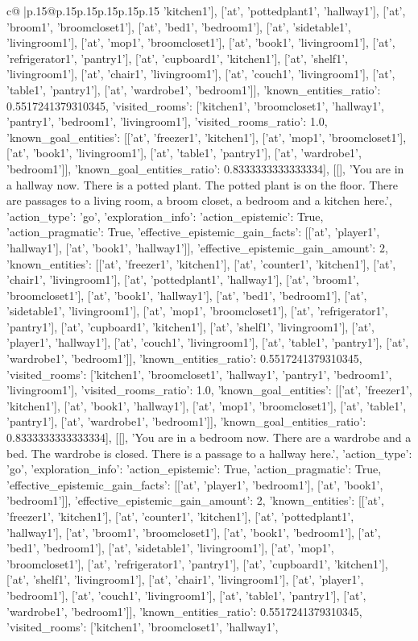 \documentclass{article}
\begin{document}
{\begin{supertabular}{c@{$\;$}|p{.15\linewidth}@{}p{.15\linewidth}p{.15\linewidth}p{.15\linewidth}p{.15\linewidth}p{.15\linewidth}}
{{{'kitchen1'], ['at', 'pottedplant1', 'hallway1'], ['at', 'broom1', 'broomcloset1'], ['at', 'bed1', 'bedroom1'], ['at', 'sidetable1', 'livingroom1'], ['at', 'mop1', 'broomcloset1'], ['at', 'book1', 'livingroom1'], ['at', 'refrigerator1', 'pantry1'], ['at', 'cupboard1', 'kitchen1'], ['at', 'shelf1', 'livingroom1'], ['at', 'chair1', 'livingroom1'], ['at', 'couch1', 'livingroom1'], ['at', 'table1', 'pantry1'], ['at', 'wardrobe1', 'bedroom1']], 'known_entities_ratio': 0.5517241379310345, 'visited_rooms': ['kitchen1', 'broomcloset1', 'hallway1', 'pantry1', 'bedroom1', 'livingroom1'], 'visited_rooms_ratio': 1.0, 'known_goal_entities': [['at', 'freezer1', 'kitchen1'], ['at', 'mop1', 'broomcloset1'], ['at', 'book1', 'livingroom1'], ['at', 'table1', 'pantry1'], ['at', 'wardrobe1', 'bedroom1']], 'known_goal_entities_ratio': 0.8333333333333334}}], [[], 'You are in a hallway now. There is a potted plant. The potted plant is on the floor. There are passages to a living room, a broom closet, a bedroom and a kitchen here.', {'action_type': 'go', 'exploration_info': {'action_epistemic': True, 'action_pragmatic': True, 'effective_epistemic_gain_facts': [['at', 'player1', 'hallway1'], ['at', 'book1', 'hallway1']], 'effective_epistemic_gain_amount': 2, 'known_entities': [['at', 'freezer1', 'kitchen1'], ['at', 'counter1', 'kitchen1'], ['at', 'chair1', 'livingroom1'], ['at', 'pottedplant1', 'hallway1'], ['at', 'broom1', 'broomcloset1'], ['at', 'book1', 'hallway1'], ['at', 'bed1', 'bedroom1'], ['at', 'sidetable1', 'livingroom1'], ['at', 'mop1', 'broomcloset1'], ['at', 'refrigerator1', 'pantry1'], ['at', 'cupboard1', 'kitchen1'], ['at', 'shelf1', 'livingroom1'], ['at', 'player1', 'hallway1'], ['at', 'couch1', 'livingroom1'], ['at', 'table1', 'pantry1'], ['at', 'wardrobe1', 'bedroom1']], 'known_entities_ratio': 0.5517241379310345, 'visited_rooms': ['kitchen1', 'broomcloset1', 'hallway1', 'pantry1', 'bedroom1', 'livingroom1'], 'visited_rooms_ratio': 1.0, 'known_goal_entities': [['at', 'freezer1', 'kitchen1'], ['at', 'book1', 'hallway1'], ['at', 'mop1', 'broomcloset1'], ['at', 'table1', 'pantry1'], ['at', 'wardrobe1', 'bedroom1']], 'known_goal_entities_ratio': 0.8333333333333334}}], [[], 'You are in a bedroom now. There are a wardrobe and a bed. The wardrobe is closed. There is a passage to a hallway here.', {'action_type': 'go', 'exploration_info': {'action_epistemic': True, 'action_pragmatic': True, 'effective_epistemic_gain_facts': [['at', 'player1', 'bedroom1'], ['at', 'book1', 'bedroom1']], 'effective_epistemic_gain_amount': 2, 'known_entities': [['at', 'freezer1', 'kitchen1'], ['at', 'counter1', 'kitchen1'], ['at', 'pottedplant1', 'hallway1'], ['at', 'broom1', 'broomcloset1'], ['at', 'book1', 'bedroom1'], ['at', 'bed1', 'bedroom1'], ['at', 'sidetable1', 'livingroom1'], ['at', 'mop1', 'broomcloset1'], ['at', 'refrigerator1', 'pantry1'], ['at', 'cupboard1', 'kitchen1'], ['at', 'shelf1', 'livingroom1'], ['at', 'chair1', 'livingroom1'], ['at', 'player1', 'bedroom1'], ['at', 'couch1', 'livingroom1'], ['at', 'table1', 'pantry1'], ['at', 'wardrobe1', 'bedroom1']], 'known_entities_ratio': 0.5517241379310345, 'visited_rooms': ['kitchen1', 'broomcloset1', 'hallway1', }}}
\end{supertabular}}
\end{document}
